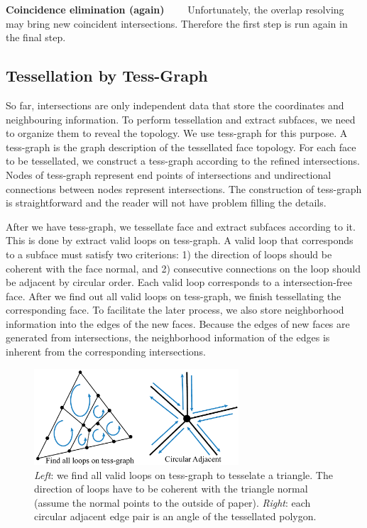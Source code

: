 \documentclass[10pt,journal,compsoc]{IEEEtran}
\begin{document}
\vspace{0.5em}
\noindent \textbf{Coincidence elimination (again)}~~~~
Unfortunately, the overlap resolving may bring new coincident intersections. Therefore the first step is run again in the final step.


\subsection{Tessellation by Tess-Graph}
\label{sec:tess}



So far, intersections are only independent data that store the coordinates and neighbouring information. To perform tessellation and extract subfaces, we need to organize them to reveal the topology. We use tess-graph for this purpose. A tess-graph is the graph description of the tessellated face topology. For each face to be tessellated, we construct a tess-graph according to the refined intersections. Nodes of tess-graph represent end points of intersections and undirectional connections between nodes represent intersections. The construction of tess-graph is straightforward and the reader will not have problem filling the details.


After we have tess-graph, we tessellate face and extract subfaces according to it. This is done by extract valid loops on tess-graph. A valid loop that corresponds to a subface must satisfy two criterions: 1) the direction of loops should be coherent with the face normal, and 2) consecutive connections on the loop should be adjacent by circular order. Each valid loop corresponds to a intersection-free face. After we find out all valid loops on tess-graph, we finish tessellating the corresponding face. To facilitate the later process, we also store neighborhood information into the edges of the new faces. Because the edges of new faces are generated from intersections, the neighborhood information of the edges is inherent from the corresponding intersections.

\begin{figure}[t]
\centering
\includegraphics[width=3in]{circularadj}
\caption{\emph{Left}: we find all valid loops on tess-graph to tesselate a triangle. The direction of loops have to be coherent with the triangle normal (assume the normal points to the outside of paper). \emph{Right}: each circular adjacent edge pair is an angle of the tessellated polygon.}
\label{fig:cadj}
\end{figure}
\end{document}
